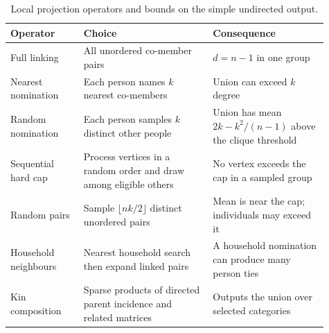 \begin{table}[!htbp]
\centering\small
\caption{Local projection operators and bounds on the simple undirected output.}
\label{tab:operators}
\begin{tabular}{@{} >{\raggedright\arraybackslash}p{0.21\linewidth} >{\raggedright\arraybackslash}p{0.37\linewidth} >{\raggedright\arraybackslash}p{0.33\linewidth} @{}}
\toprule
\rowcolor{tableblue} \textbf{Operator} & \textbf{Choice} & \textbf{Consequence} \\
\midrule
Full linking & All unordered co-member pairs & $d=n-1$ in one group \\
Nearest nomination & Each person names $k$ nearest co-members & Union can exceed $k$ degree \\
Random nomination & Each person samples $k$ distinct other people & Union has mean $2k-k^2/(n-1)$ above the clique threshold \\
Sequential hard cap & Process vertices in a random order and draw among eligible others & No vertex exceeds the cap in a sampled group \\
Random pairs & Sample $\lfloor nk/2\rfloor$ distinct unordered pairs & Mean is near the cap; individuals may exceed it \\
Household neighbours & Nearest household search then expand linked pairs & A household nomination can produce many person ties \\
Kin composition & Sparse products of directed parent incidence and related matrices & Outputs the union over selected categories \\
\bottomrule
\end{tabular}
\end{table}
